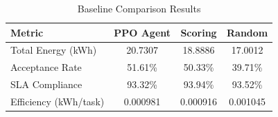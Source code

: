 
\begin{table}[h]
\centering
\caption{Baseline Comparison Results}
\label{tab:baseline}
\begin{tabular}{lccc}
\toprule
\textbf{Metric} & \textbf{PPO Agent} & \textbf{Scoring} & \textbf{Random} \\
\midrule
Total Energy (kWh) & 20.7307 & 18.8886 & 17.0012 \\
Acceptance Rate & 51.61\% & 50.33\% & 39.71\% \\
SLA Compliance & 93.32\% & 93.94\% & 93.52\% \\
Efficiency (kWh/task) & 0.000981 & 0.000916 & 0.001045 \\
\bottomrule
\end{tabular}
\end{table}
